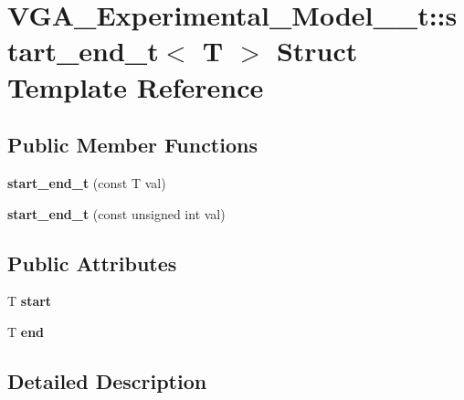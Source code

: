 \hypertarget{structVGA__Experimental__Model__1__t_1_1start__end__t}{\section{V\-G\-A\-\_\-\-Experimental\-\_\-\-Model\-\_\-\_\-t\-:\-:start\-\_\-end\-\_\-t$<$ T $>$ Struct Template Reference}
\label{structVGA__Experimental__Model__1__t_1_1start__end__t}
}
\subsection*{Public Member Functions}
\begin{DoxyCompactItemize}
\item 
\hypertarget{structVGA__Experimental__Model__1__t_1_1start__end__t_a9677745f215b0eaa0322dcef53d91637}{{\bfseries start\-\_\-end\-\_\-t} (const T val)}\label{structVGA__Experimental__Model__1__t_1_1start__end__t_a9677745f215b0eaa0322dcef53d91637}

\item 
\hypertarget{structVGA__Experimental__Model__1__t_1_1start__end__t_a9af5be1addf30aa2611273ecf89851b9}{{\bfseries start\-\_\-end\-\_\-t} (const unsigned int val)}\label{structVGA__Experimental__Model__1__t_1_1start__end__t_a9af5be1addf30aa2611273ecf89851b9}

\end{DoxyCompactItemize}
\subsection*{Public Attributes}
\begin{DoxyCompactItemize}
\item 
\hypertarget{structVGA__Experimental__Model__1__t_1_1start__end__t_a5fb492526d691834a86da58e56076e1f}{T {\bfseries start}}\label{structVGA__Experimental__Model__1__t_1_1start__end__t_a5fb492526d691834a86da58e56076e1f}

\item 
\hypertarget{structVGA__Experimental__Model__1__t_1_1start__end__t_a4ee4065b782f25dee03606b6fdca2e39}{T {\bfseries end}}\label{structVGA__Experimental__Model__1__t_1_1start__end__t_a4ee4065b782f25dee03606b6fdca2e39}

\end{DoxyCompactItemize}


\subsection{Detailed Description}
